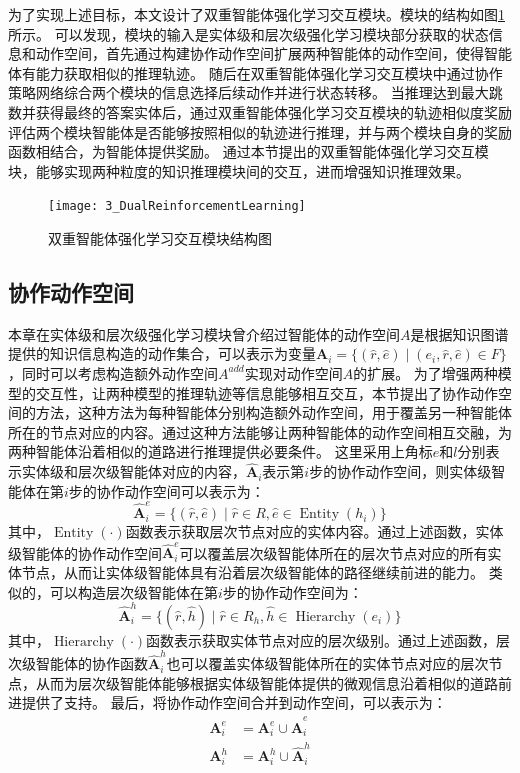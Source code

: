 \documentclass[algorithmlist, AutoFakeBold, AutoFakeSlant, figurelist, tablelist, nomlist, engineering]{seuthesix}
\begin{document}
为了实现上述目标，本文设计了双重智能体强化学习交互模块。模块的结构如图\ref{3_DualReinforcementLearning}所示。
可以发现，模块的输入是实体级和层次级强化学习模块部分获取的状态信息和动作空间，首先通过构建协作动作空间扩展两种智能体的动作空间，使得智能体有能力获取相似的推理轨迹。
随后在双重智能体强化学习交互模块中通过协作策略网络综合两个模块的信息选择后续动作并进行状态转移。
当推理达到最大跳数并获得最终的答案实体后，通过双重智能体强化学习交互模块的轨迹相似度奖励评估两个模块智能体是否能够按照相似的轨迹进行推理，并与两个模块自身的奖励函数相结合，为智能体提供奖励。
通过本节提出的双重智能体强化学习交互模块，能够实现两种粒度的知识推理模块间的交互，进而增强知识推理效果。
\begin{figure}
  \centering
  \texttt{[image: 3\_DualReinforcementLearning]}
  \caption{双重智能体强化学习交互模块结构图}
  \label{3_DualReinforcementLearning}
\end{figure}

\subsection{协作动作空间}
本章在实体级和层次级强化学习模块曾介绍过智能体的动作空间$A$是根据知识图谱提供的知识信息构造的动作集合，可以表示为变量$\bm{A}_i = \{(\hat{r}, \hat{e}) \mid (e_i, \hat{r}, \hat{e}) \in F\}$，同时可以考虑构造额外动作空间$A^{add}$实现对动作空间$A$的扩展。
为了增强两种模型的交互性，让两种模型的推理轨迹等信息能够相互交互，本节提出了协作动作空间的方法，这种方法为每种智能体分别构造额外动作空间，用于覆盖另一种智能体所在的节点对应的内容。通过这种方法能够让两种智能体的动作空间相互交融，为两种智能体沿着相似的道路进行推理提供必要条件。
这里采用上角标$e$和$l$分别表示实体级和层次级智能体对应的内容，$\bm{\hat{A}}_i$表示第$i$步的协作动作空间，则实体级智能体在第$i$步的协作动作空间可以表示为：
\begin{equation}
  \bm{\hat{A}}_i^{e} = \{(\hat{r}, \hat{e}) \mid \hat{r} \in R, \hat{e} \in \operatorname{Entity}(h_i)\}
  \label{coo_1}
\end{equation}
其中，$\operatorname{Entity}(\cdot)$函数表示获取层次节点对应的实体内容。通过上述函数，实体级智能体的协作动作空间$\bm{\hat{A}}_i^{e}$可以覆盖层次级智能体所在的层次节点对应的所有实体节点，从而让实体级智能体具有沿着层次级智能体的路径继续前进的能力。
类似的，可以构造层次级智能体在第$i$步的协作动作空间为：
\begin{equation}
  \bm{\hat{A}}_i^{h} = \{(\hat{r}, \hat{h}) \mid \hat{r} \in R_h, \hat{h} \in \operatorname{Hierarchy}(e_i)\}
  \label{coo_2}
\end{equation}
其中，$\operatorname{Hierarchy}(\cdot)$函数表示获取实体节点对应的层次级别。通过上述函数，层次级智能体的协作函数$\bm{\hat{A}}_i^{h}$也可以覆盖实体级智能体所在的实体节点对应的层次节点，从而为层次级智能体能够根据实体级智能体提供的微观信息沿着相似的道路前进提供了支持。
最后，将协作动作空间合并到动作空间，可以表示为：
\begin{equation}
  \begin{aligned}
    \bm{A}_i^{e} &= \bm{A}_i^{e} \cup \bm{\hat{A}}_i^{e} \\
    \bm{A}_i^{h} &= \bm{A}_i^{h} \cup \bm{\hat{A}}_i^{h}
  \end{aligned}
\end{equation}
\end{document}

